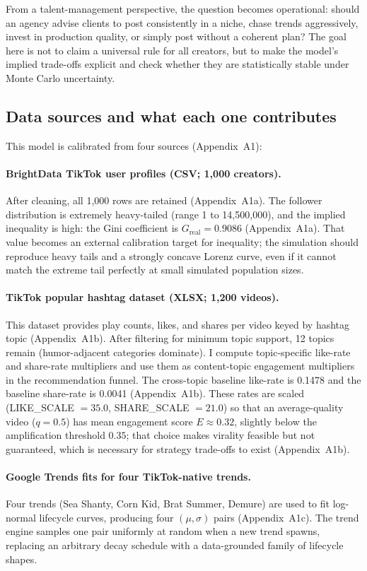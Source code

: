 \documentclass[10pt]{article}
\newcommand{\appref}[1]{(Appendix~#1)}
\begin{document}
From a talent-management perspective, the question becomes operational: should an agency advise clients to post consistently in a niche, chase trends aggressively, invest in production quality, or simply post without a coherent plan? The goal here is not to claim a universal rule for all creators, but to make the model's implied trade-offs explicit and check whether they are statistically stable under Monte Carlo uncertainty.

\subsection{Data sources and what each one contributes}
This model is calibrated from four sources \appref{A1}:

\paragraph{BrightData TikTok user profiles (CSV; 1{,}000 creators).}
After cleaning, all 1{,}000 rows are retained \appref{A1a}. The follower distribution is extremely heavy-tailed (range 1 to 14{,}500{,}000), and the implied inequality is high: the Gini coefficient is \(G_{\text{real}} = 0.9086\) \appref{A1a}. That value becomes an external calibration target for inequality; the simulation should reproduce heavy tails and a strongly concave Lorenz curve, even if it cannot match the extreme tail perfectly at small simulated population sizes.

\paragraph{TikTok popular hashtag dataset (XLSX; 1{,}200 videos).}
This dataset provides play counts, likes, and shares per video keyed by hashtag topic \appref{A1b}. After filtering for minimum topic support, 12 topics remain (humor-adjacent categories dominate). I compute topic-specific like-rate and share-rate multipliers and use them as content-topic engagement multipliers in the recommendation funnel. The cross-topic baseline like-rate is 0.1478 and the baseline share-rate is 0.0041 \appref{A1b}. These rates are scaled (LIKE\_SCALE \(=35.0\), SHARE\_SCALE \(=21.0\)) so that an average-quality video (\(q=0.5\)) has mean engagement score \(E \approx 0.32\), slightly below the amplification threshold \(0.35\); that choice makes virality feasible but not guaranteed, which is necessary for strategy trade-offs to exist \appref{A1b}.

\paragraph{Google Trends fits for four TikTok-native trends.}
Four trends (Sea Shanty, Corn Kid, Brat Summer, Demure) are used to fit log-normal lifecycle curves, producing four \((\mu,\sigma)\) pairs \appref{A1c}. The trend engine samples one pair uniformly at random when a new trend spawns, replacing an arbitrary decay schedule with a data-grounded family of lifecycle shapes.
\end{document}
